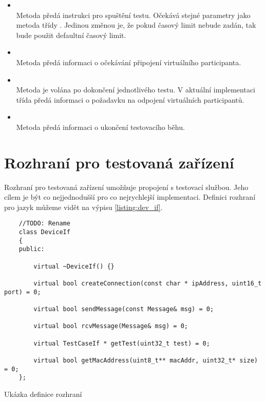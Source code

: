 \begin{itemize}
    \item {} \\ Metoda předá instrukci pro spuštění testu. Očekává stejné parametry jako metoda  třídy . Jedinou změnou je, že pokud časový limit nebude zadán, tak bude použit defaultní časový limit.
    \item {} \\ Metoda předá informaci o očekávání připojení virtuálního participanta.
    \item {} \\ Metoda je volána po dokončení jednotlivého testu. V aktuální implementaci třída předá informaci o požadavku na odpojení virtuálních participantů.
    \item {} \\ Metoda předá informaci o ukončení testovacího běhu.
\end{itemize}


\section{Rozhraní pro testovaná zařízení}

Rozhraní pro testovaná zařízení umožňuje propojení s testovací službou. Jeho cílem je být co nejjednodušší pro co nejrychlejší implementaci. Definici rozhraní pro jazyk  můžeme vidět na výpisu \ref{listing:dev_if}.

\begin{listing}[htbp]
    \begin{verbatim}
    //TODO: Rename
    class DeviceIf
    {
    public:

        virtual ~DeviceIf() {}

        virtual bool createConnection(const char * ipAddress, uint16_t port) = 0;

        virtual bool sendMessage(const Message& msg) = 0;

        virtual bool rcvMessage(Message& msg) = 0;

        virtual TestCaseIf * getTest(uint32_t test) = 0;

        virtual bool getMacAddress(uint8_t** macAddr, uint32_t* size) = 0;
    };
    \end{verbatim}
\caption{Ukázka definice rozhraní}
\label{listing:dev_if}
\end{listing}

